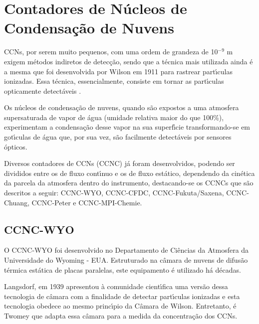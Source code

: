 \doublespacing
\chapter{Contadores de N\'{u}cleos de Condensa\c{c}\~{a}o de Nuvens}
\label{cap:CCNC_revis\~{a}o}

 CCNs, por serem muito pequenos, com uma ordem de grandeza de 10$^{-9}$ m exigem m\'{e}todos indiretos de detec\c{c}\~{a}o, sendo que a t\'{e}cnica mais utilizada ainda \'{e} a mesma que foi desenvolvida por  Wilson em 1911 para rastrear part\'{\i}culas ionizadas. Essa t\'{e}cnica, essencialmente, consiste em tornar as part\'{\i}culas opticamente detect\'{a}veis \cite{Matteo,wilson}.

Os n\'{u}cleos de condensa\c{c}\~{a}o de nuvens, quando s\~{a}o expostos a uma atmosfera supersaturada de vapor de \'{a}gua (umidade relativa maior do que 100\%), experimentam a condensa\c{c}\~{a}o desse vapor na sua superf\'{\i}cie transformando-se em  got\'{\i}culas de \'{a}gua que, por sua vez, s\~{a}o facilmente detect\'{a}veis por sensores \'{o}pticos.

Diversos contadores de CCNs (CCNC) j\'{a} foram desenvolvidos, podendo ser divididos entre os de fluxo cont\'{\i}nuo e os de fluxo est\'{a}tico, dependendo da cin\'{e}tica da parcela da atmosfera dentro do instrumento, destacando-se os CCNCs que s\~{a}o descritos a seguir: CCNC-WYO, CCNC-CFDC, CCNC-Fukuta/Saxena, CCNC-Chuang, CCNC-Peter e CCNC-MPI-Chemie.


\section{CCNC-WYO}

O CCNC-WYO foi desenvolvido no Departamento de Ci\^{e}ncias da Atmosfera da Universidade do Wyoming - EUA.
Estruturado na c\^{a}mara de nuvens de difus\~{a}o t\'{e}rmica est\'{a}tica de placas paralelas, este equipamento \'{e} utilizado h\'{a} d\'{e}cadas.

Langsdorf, em 1939 \cite{Langsdorf} apresentou \`{a} comunidade cient\'{\i}fica uma vers\~{a}o dessa tecnologia de c\^{a}mara com a finalidade de detectar part\'{\i}culas ionizadas e esta tecnologia obedece ao mesmo princ\'{\i}pio da C\^{a}mara de Wilson. Entretanto, \'{e} Twomey \cite{twomey} que adapta essa c\^{a}mara para a medida da concentra\c{c}\~{a}o dos CCNs.

